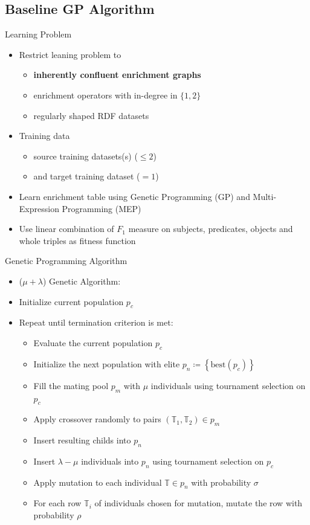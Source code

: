 \documentclass[aspectratio=1610,table]{beamer}
\begin{document}
\subsection{Baseline GP Algorithm}


\begin{frame}{Learning Problem}
\begin{itemize}[<+->]
  \item Restrict leaning problem to
  \begin{itemize}
    \item   \textbf{inherently confluent enrichment graphs}
     \item   enrichment operators with in-degree in $\{1,2\}$
     \item regularly shaped RDF datasets
  \end{itemize}    
  \item Training data
  \begin{itemize}
    \item source training datasets(s) ($\leq 2$)
     \item  and target training dataset ($=1$)
  \end{itemize}
  \item Learn enrichment table using Genetic Programming (GP) and Multi-Expression Programming (MEP)
  \item Use linear combination of $F_1$ measure on subjects, predicates, objects and whole triples as fitness function
\end{itemize}
\end{frame}



\begin{frame}{Genetic Programming Algorithm}
  \begin{itemize}[<+->]
    \item ($\mu + \lambda$) Genetic Algorithm:
    \item Initialize current population $p_c$
    \item Repeat until termination criterion is met:
      \begin{itemize}
        \item Evaluate the current population $p_c$
        \item Initialize the next population with elite $p_n\coloneq \left\{\text{best}(p_c)\right\}$
        \item Fill the mating pool $p_m$ with $\mu$ individuals using tournament selection on $p_c$
        \item Apply crossover randomly to pairs $(\mathbb{T}_1,\mathbb{T}_2)\in p_m$
        \item Insert resulting childs into $p_n$
        \item Insert $\lambda - \mu$ individuals into $p_n$ using tournament selection on $p_c$
        \item Apply mutation to each individual $\mathbb{T}\in p_n$ with probability $\sigma$
        \item For each row $\mathbb{T}_i$ of individuals chosen for mutation, mutate the row with probability $\rho$
      \end{itemize}
  \end{itemize}
\end{frame}
\end{document}
